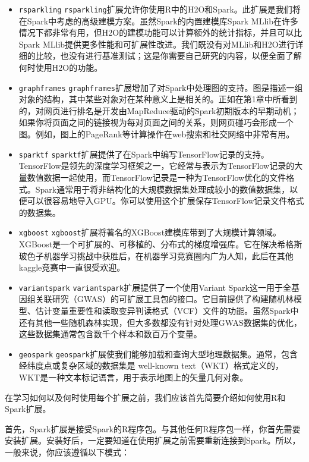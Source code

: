 \documentclass[
]{article}
\providecommand{\tightlist}{%
  \setlength{\itemsep}{0pt}\setlength{\parskip}{0pt}}
\begin{document}
\begin{itemize}
\tightlist
\item
  \texttt{rsparkling}
  \texttt{rsparkling}扩展允许你使用R中的H2O和Spark。此扩展是我们将在Spark中考虑的高级建模方案。虽然Spark的内置建模库Spark
  MLlib在许多情况下都非常有用，但H2O的建模功能可以计算额外的统计指标，并且可以比Spark
  MLlib提供更多性能和可扩展性改进。我们既没有对MLlib和H2O进行详细的比较，也没有进行基准测试；这是你需要自己研究的内容，以便全面了解何时使用H2O的功能。
\item
  \texttt{graphframes}
  \texttt{graphframes}扩展增加了对Spark中处理图的支持。图是描述一组对象的结构，其中某些对象对在某种意义上是相关的。正如在第1章中所看到的，对网页进行排名是开发由MapReduce驱动的Spark初期版本的早期动机；如果你将页面之间的链接视为每对页面之间的关系，则网页碰巧会形成一个图。例如，图上的PageRank等计算操作在web搜索和社交网络中非常有用。
\item
  \texttt{sparktf}
  \texttt{sparktf}扩展提供了在Spark中编写TensorFlow记录的支持。TensorFlow是领先的深度学习框架之一，它经常与表示为TensorFlow记录的大量数值数据一起使用，而TensorFlow记录是一种为TensorFlow优化的文件格式。Spark通常用于将非结构化的大规模数据集处理成较小的数值数据集，以便可以很容易地导入GPU。你可以使用这个扩展保存TensorFlow记录文件格式的数据集。
\item
  \texttt{xgboost}
  \texttt{xgboost}扩展将著名的XGBoost建模库带到了大规模计算领域。XGBoost是一个可扩展的、可移植的、分布式的梯度增强库。它在解决希格斯玻色子机器学习挑战中获胜后，在机器学习竞赛圈内广为人知，此后在其他kaggle竞赛中一直很受欢迎。
\item
  \texttt{variantspark} \texttt{variantspark}扩展提供了一个使用Variant
  Spark这一用于全基因组关联研究（GWAS）的可扩展工具包的接口。它目前提供了构建随机林模型、估计变量重要性和读取变异判读格式（VCF）文件的功能。虽然Spark中还有其他一些随机森林实现，但大多数都没有针对处理GWAS数据集的优化，这些数据集通常包含数千个样本和数百万个变量。
\item
  \texttt{geospark}
  \texttt{geospark}扩展使我们能够加载和查询大型地理数据集。通常，包含经纬度点或复杂区域的数据集是
  well-known
  text（WKT）格式定义的，WKT是一种文本标记语言，用于表示地图上的矢量几何对象。
\end{itemize}

在学习如何以及何时使用每个扩展之前，我们应该首先简要介绍如何使用R和Spark扩展。

首先，Spark扩展是接受Spark的R程序包。与其他任何R程序包一样，你首先需要安装扩展。安装好后，一定要知道在使用扩展之前需要重新连接到Spark。所以，一般来说，你应该遵循以下模式：
\end{document}
